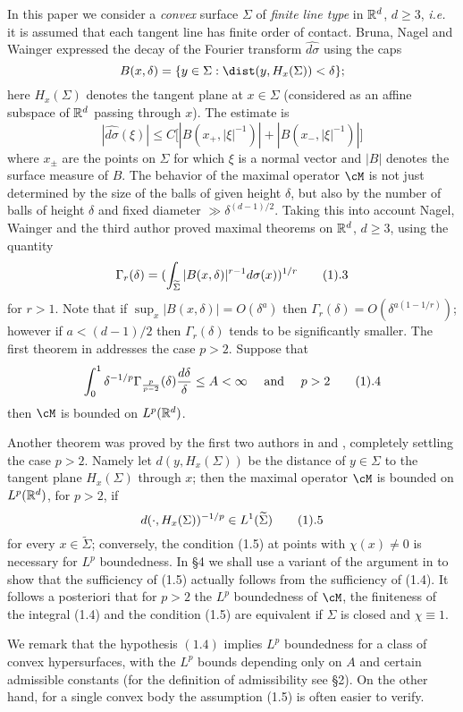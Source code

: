 In this paper we consider a {\it convex } surface $\Sigma$
of {\it finite line type} in $\Bbb R^d$,  $d\ge 3$,
{\it i.e.} it  is assumed that each tangent line has finite order of contact. 
Bruna, Nagel and Wainger \cite{2} expressed the decay of the Fourier transform
$\widehat{d\sigma}$ using the caps
$$
B(x,\delta)=\{y\in \Sigma: \dist(y,H_x(\Sigma))<\delta\};
$$
here  $H_x(\Sigma)$ denotes the tangent plane at $x\in \Sigma$ 
(considered as an affine subspace of $\Bbb R^d$ passing through $x$). The 
estimate is $$|\widehat {d\sigma}(\xi)|\le C \big[
|B(x_+,|\xi|^{-1})|+|B(x_-,|\xi|^{-1})| \big]
$$
where $x_\pm$ are the points on $\Sigma$ for which $\xi$ is a
normal vector and  $|B|$ denotes  the surface measure of $B$.
The behavior of the maximal operator $\cM$ is not just determined 
by the size of the balls of given height $\delta$, but also by the number 
of balls of height $\delta$  and fixed   diameter $\gg \delta^{(d-1)/2}$. 
Taking  this into account
 Nagel, Wainger and the third author \cite{18}  proved  maximal theorems 
on $\Bbb R^d$, $d\ge 3$,
using the quantity 
$$
\Gamma_r(\delta)=(\int_\tSi|B(x,\delta)|^{r-1}d\sigma(x))^{1/r} \tag 1.3
$$
for $r>1$.
Note that if $\sup_x |B(x,\delta)|=O( \delta^a)$ then 
$\Gamma_r(\delta)=O(\delta^{a(1-1/r)})$; however if $a<(d-1)/2$ then 
$\Gamma_r(\delta)$ tends to be significantly smaller.
The first theorem in \cite{18} addresses the case $p>2$. Suppose that
$$
\int_0^1
\delta^{-1/p}\Gamma_{\frac{p}{p-2}}(\delta)\frac {d\delta}{\delta}
\le A<\infty \quad \text{ and } \quad p>2
\tag 1.4
$$
then
$\cM$ is bounded on $L^p(\Bbb R^d)$.


Another  theorem was proved by the first two authors 
in \cite{14} and \cite{13}, completely settling the case  $p>2$.
Namely let 
$d(y,H_x(\Sigma))$ be the distance of $y\in \Sigma$ to the tangent plane 
$H_x(\Sigma)$ through $x$; then  
the maximal operator 
 $\cM$ is bounded on $L^p(\Bbb R^d)$, for $p>2$,
if $$d(\cdot, H_x(\Sigma))^{-1/p}\in L^1(\widetilde \Sigma)\tag 1.5$$
for every
$x\in \widetilde\Sigma$;
conversely,  the condition (1.5) at points with $\chi(x)\neq 0$
is  necessary  for $L^p$ boundedness.
In \S4 we shall use a variant of the argument in \cite{14}
to show that the sufficiency of (1.5) actually follows from
the sufficiency of (1.4). It follows a posteriori
that  for $p>2$ the $L^p$ boundedness of $\cM$, the finiteness of the integral
 (1.4) and
the condition  (1.5) are  equivalent
if $\Sigma$ is closed and $\chi\equiv 1$.


We remark that the hypothesis $(1.4)$ implies $L^p$ boundedness for a 
class of convex hypersurfaces, with the $L^p$ bounds depending only
 on $A$ and certain 
admissible constants (for the definition of admissibility see \S2).
 On the other hand, 
for a single convex body the assumption (1.5) 
is often easier to verify.





